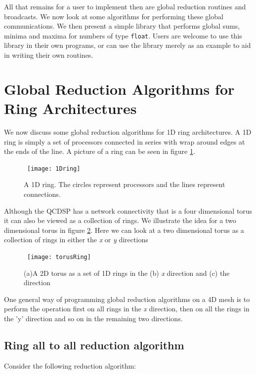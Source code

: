 All that remains for a user to implement then are global reduction
routines and broadcasts. We now look at some algorithms for
performing these global communications. We then present a simple
library that performs global sums, minima and maxima for numbers of
type {\tt float}. Users are welcome to use this library in their own
programs, or can use the library merely as an example to aid in
writing their own routines.

\section{Global Reduction Algorithms for Ring Architectures}
We now discuss some global reduction algorithms for 1D ring architectures.
A 1D ring is simply a set of processors connected in series with 
wrap around edges at the ends of the line. A picture of a ring can
be seen in figure \ref{f:1Dring}.
\begin{figure}
\begin{center}
\leavevmode
\hbox{%
\texttt{[image: 1Dring]}
}
\end{center}
\caption{A 1D ring. The circles represent processors and the lines
represent connections.}
\label{f:1Dring}
\end{figure}

Although the QCDSP has a network connectivity that is a four dimensional 
torus it can also be viewed as a collection of rings. We illustrate
the idea for a two dimensional torus in figure \ref{f:TorusRing}.
Here we can look at a two dimensional torus as a collection of rings in
either the {\em x} or {\em y} directions
\begin{figure}
\begin{center}
\leavevmode
\hbox{%
\texttt{[image: torusRing]}
}
\end{center}
\caption{(a)A 2D torus as a set of 1D rings in the (b) {\em x} direction and (c) the {\em} direction}  
\label{f:TorusRing}
\end{figure}

One general way of programming global reduction algorithms on a 4D mesh
is to perform the operation first on all rings in the {\em x} direction,
then on all the rings in the 'y' direction and so on in the remaining two
directions. 

\subsection{Ring all to all reduction algorithm}
Consider the following reduction algorithm:

